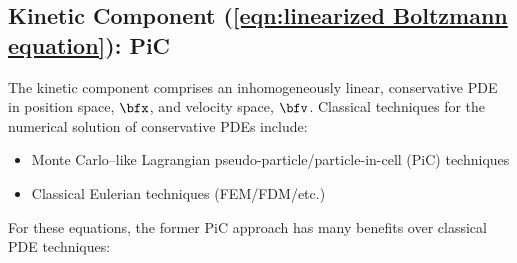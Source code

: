\subsection*{Kinetic Component (\ref{eqn:linearized Boltzmann equation}): PiC}
    The kinetic component comprises an inhomogeneously linear, conservative PDE in position space, $\bfx$, and velocity space, $\bfv$. Classical techniques for the numerical solution of conservative PDEs include:
    \begin{itemize}
        \item  Monte Carlo--like Lagrangian pseudo-particle/particle-in-cell (PiC) techniques
        \item  Classical Eulerian techniques (FEM/FDM/etc.)
    \end{itemize}
    For these equations, the former PiC approach has many benefits over classical PDE techniques:
